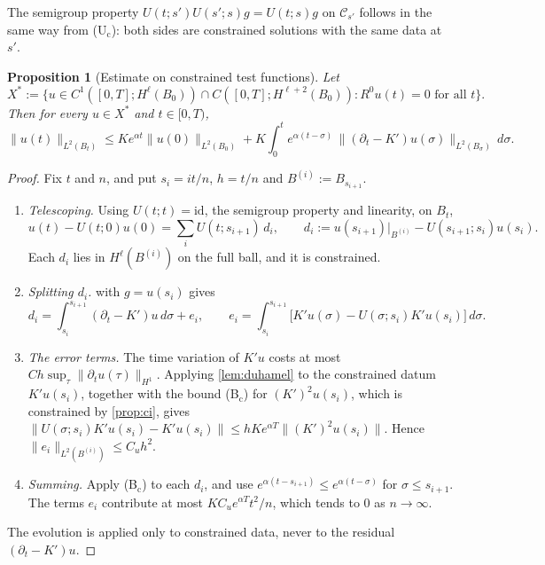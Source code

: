 \documentclass[11pt]{article}
\theoremstyle{plain}
\newtheorem{proposition}[theorem]{Proposition}
\theoremstyle{definition}
\theoremstyle{remark}
\newcommand{\Ccal}{\mathcal{C}}
\begin{document}
The semigroup property $U(t;s')U(s';s)g = U(t;s)g$ on $\Ccal_{s'}$ follows in the same way from (U$_{\mathrm c}$): both sides are constrained solutions with the same data at $s'$.

\begin{proposition}[Estimate on constrained test functions]\label{prop:wh}
Let
\[
  X^* := \bigl\{u \in C^1([0,T];H^\ell(B_0)) \cap C([0,T];H^{\ell+2}(B_0)) : R^0u(t) = 0 \text{ for all } t\bigr\}.
\]
Then for every $u \in X^*$ and $t \in [0,T)$,
\begin{equation}\label{eq:wh}
  \|u(t)\|_{L^2(B_t)} \le K e^{\alpha t}\|u(0)\|_{L^2(B_0)} + K\int_0^t e^{\alpha(t-\sigma)}\,\bigl\|(\partial_t - K')u(\sigma)\bigr\|_{L^2(B_\sigma)}\,d\sigma .
\end{equation}
\end{proposition}

\begin{proof}
Fix $t$ and $n$, and put $s_i = it/n$, $h = t/n$ and $B^{(i)} := B_{s_{i+1}}$.
\begin{enumerate}
  \item \emph{Telescoping.} Using $U(t;t) = \mathrm{id}$, the semigroup property and linearity, on $B_t$,
  \[
    u(t) - U(t;0)u(0) = \sum_i U(t;s_{i+1})\,d_i,
    \qquad d_i := u(s_{i+1})|_{B^{(i)}} - U(s_{i+1};s_i)u(s_i).
  \]
  Each $d_i$ lies in $H^\ell(B^{(i)})$ on the full ball, and it is constrained.
  \item \emph{Splitting $d_i$.}  with $g = u(s_i)$ gives
  \[
    d_i = \int_{s_i}^{s_{i+1}} (\partial_t - K')u\,d\sigma + e_i,
    \qquad
    e_i = \int_{s_i}^{s_{i+1}} \bigl[K'u(\sigma) - U(\sigma;s_i)K'u(s_i)\bigr]\,d\sigma .
  \]
  \item \emph{The error terms.} The time variation of $K'u$ costs at most
  $Ch\sup_\tau\|\partial_tu(\tau)\|_{H^1}$. Applying \cref{lem:duhamel} to the constrained datum $K'u(s_i)$, together with the bound (B$_{\mathrm c}$) for $(K')^2u(s_i)$, which is constrained by \cref{prop:ci}, gives $\|U(\sigma;s_i)K'u(s_i) - K'u(s_i)\| \le hKe^{\alpha T}\|(K')^2u(s_i)\|$. Hence $\|e_i\|_{L^2(B^{(i)})} \le C_u h^2$.
  \item \emph{Summing.} Apply (B$_{\mathrm c}$) to each $d_i$, and use $e^{\alpha(t - s_{i+1})} \le e^{\alpha(t-\sigma)}$ for $\sigma \le s_{i+1}$. The terms $e_i$ contribute at most $KC_ue^{\alpha T}t^2/n$, which tends to $0$ as $n \to \infty$.
\end{enumerate}
The evolution is applied only to constrained data, never to the residual $(\partial_t - K')u$.
\end{proof}
\end{document}
